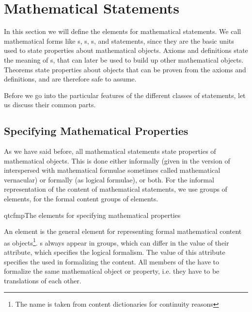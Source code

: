 \section{Mathematical Statements}\label{sec:statements}

In this section we will define the {\omdoc} elements for mathematical
statements. We call
mathematical forms like {s}, {s},
{s}, and {} statements, since they are the
basic units used to state properties about mathematical objects. Axioms and
definitions state the meaning of {}s, that can later be used to
build up other mathematical objects.  Theorems state properties about objects that
can be proven from the axioms and definitions, and are therefore safe to assume.

Before we go into the particular features of the different classes of statements, let
us discuss their common parts.  

\subsection{Specifying Mathematical Properties}\label{sec:properties}

As we have said before, all mathematical statements state properties of
mathematical objects. This is done either informally (given in the
{} version of {} interspersed with mathematical formulae
sometimes called mathematical
vernacular) or
formally (as logical formulae), or both. For the informal representation of the
content of mathematical statements, we use groups of {} elements, for
the formal content groups of {} elements.

\begin{myfig}{qtcfmp}{The {\omdoc} elements for specifying mathematical properties}
  \quicktable{\CFMPtable{}}
\end{myfig}
An {} element is the general element for representing formal
mathematical content as {\openmath} objects\footnote{The name is taken from
  {\openmath} content dictionaries for continuity reasons}. {}s
always appear in groups, which can differ in the value of their
{} attribute, which specifies the logical formalism. The
value of this attribute specifies the {} used in formalizing the content. All members of
the {} have to
formalize the same mathematical object or property, i.e. they have to be
translations of each other.

